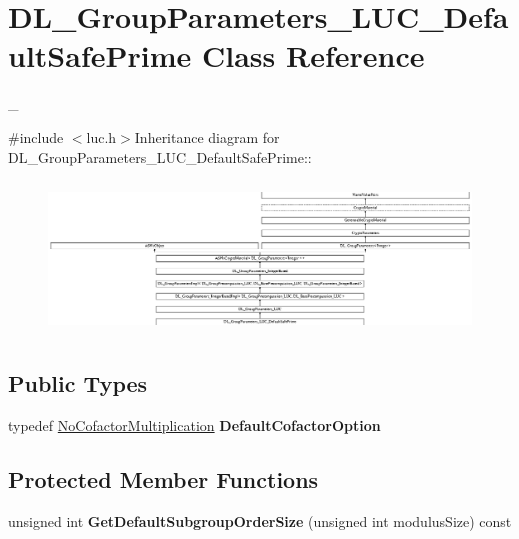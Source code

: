\hypertarget{class_d_l___group_parameters___l_u_c___default_safe_prime}{
\section{DL\_\-GroupParameters\_\-LUC\_\-DefaultSafePrime Class Reference}
\label{class_d_l___group_parameters___l_u_c___default_safe_prime}
}


\_\-  


{\ttfamily \#include $<$luc.h$>$}Inheritance diagram for DL\_\-GroupParameters\_\-LUC\_\-DefaultSafePrime::\begin{figure}[H]
\begin{center}
\leavevmode
\includegraphics[height=4.08488cm]{class_d_l___group_parameters___l_u_c___default_safe_prime}
\end{center}
\end{figure}
\subsection*{Public Types}
\begin{DoxyCompactItemize}
\item 
\hypertarget{class_d_l___group_parameters___l_u_c___default_safe_prime_a688e5112ab2717150e157be85ed1b0dc}{
typedef \hyperlink{struct_enum_to_type}{NoCofactorMultiplication} {\bfseries DefaultCofactorOption}}
\label{class_d_l___group_parameters___l_u_c___default_safe_prime_a688e5112ab2717150e157be85ed1b0dc}

\end{DoxyCompactItemize}
\subsection*{Protected Member Functions}
\begin{DoxyCompactItemize}
\item 
\hypertarget{class_d_l___group_parameters___l_u_c___default_safe_prime_a85d855420a8f32759e2790986f13a742}{
unsigned int {\bfseries GetDefaultSubgroupOrderSize} (unsigned int modulusSize) const }
\label{class_d_l___group_parameters___l_u_c___default_safe_prime_a85d855420a8f32759e2790986f13a742}

\end{DoxyCompactItemize}


